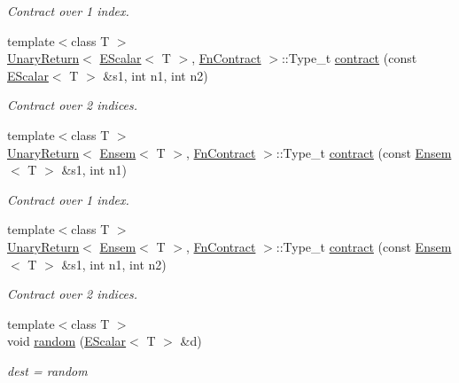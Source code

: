 \begin{DoxyCompactItemize}
\begin{DoxyCompactList}\small\item\em Contract over 1 index. \end{DoxyCompactList}\item 
{\footnotesize template$<$class T $>$ }\\\mbox{\hyperlink{structENSEM_1_1UnaryReturn}{Unary\+Return}}$<$ \mbox{\hyperlink{classENSEM_1_1EScalar}{E\+Scalar}}$<$ T $>$, \mbox{\hyperlink{structENSEM_1_1FnContract}{Fn\+Contract}} $>$\+::Type\+\_\+t \mbox{\hyperlink{namespaceENSEM_a370746f882b263d5a3925d4fae5c899b}{contract}} (const \mbox{\hyperlink{classENSEM_1_1EScalar}{E\+Scalar}}$<$ T $>$ \&s1, int n1, int n2)
\begin{DoxyCompactList}\small\item\em Contract over 2 indices. \end{DoxyCompactList}\item 
{\footnotesize template$<$class T $>$ }\\\mbox{\hyperlink{structENSEM_1_1UnaryReturn}{Unary\+Return}}$<$ \mbox{\hyperlink{classENSEM_1_1Ensem}{Ensem}}$<$ T $>$, \mbox{\hyperlink{structENSEM_1_1FnContract}{Fn\+Contract}} $>$\+::Type\+\_\+t \mbox{\hyperlink{namespaceENSEM_ab2179c14714ad6831601c4da09e4de38}{contract}} (const \mbox{\hyperlink{classENSEM_1_1Ensem}{Ensem}}$<$ T $>$ \&s1, int n1)
\begin{DoxyCompactList}\small\item\em Contract over 1 index. \end{DoxyCompactList}\item 
{\footnotesize template$<$class T $>$ }\\\mbox{\hyperlink{structENSEM_1_1UnaryReturn}{Unary\+Return}}$<$ \mbox{\hyperlink{classENSEM_1_1Ensem}{Ensem}}$<$ T $>$, \mbox{\hyperlink{structENSEM_1_1FnContract}{Fn\+Contract}} $>$\+::Type\+\_\+t \mbox{\hyperlink{namespaceENSEM_afcb2a43c3eaba0b5250358471ad25179}{contract}} (const \mbox{\hyperlink{classENSEM_1_1Ensem}{Ensem}}$<$ T $>$ \&s1, int n1, int n2)
\begin{DoxyCompactList}\small\item\em Contract over 2 indices. \end{DoxyCompactList}\item 
{\footnotesize template$<$class T $>$ }\\void \mbox{\hyperlink{namespaceENSEM_a207bad99cb32c3dd005cf6c6538f2ada}{random}} (\mbox{\hyperlink{classENSEM_1_1EScalar}{E\+Scalar}}$<$ T $>$ \&d)
\begin{DoxyCompactList}\small\item\em dest = random \end{DoxyCompactList}\item 

\end{DoxyCompactItemize}

